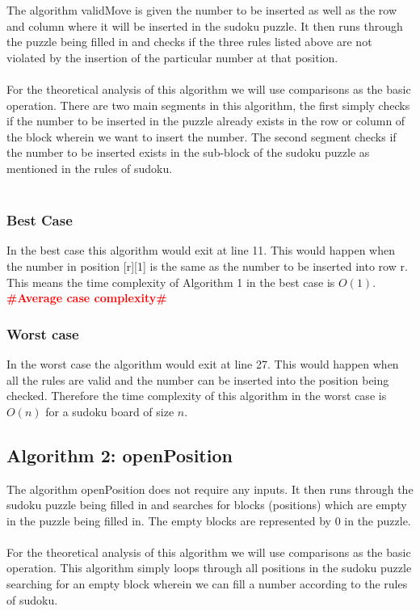 \documentclass[12pt,a4paper,titlepage]{article}
\newcommand{\todo}[1]{\textcolor{red}{\textbf{\##1\#}}}
\begin{document}
The algorithm validMove is given the number to be inserted as well as the row and column where it will be inserted in the sudoku puzzle. It then runs through the puzzle being filled in and checks if the three rules listed above are not violated by the insertion of the particular number at that position.
\\
\\
For the theoretical analysis of this algorithm we will use comparisons as the basic operation. There are two main segments in this algorithm, the first simply checks if  the number to be inserted in the puzzle already exists in the row or column of the block wherein we want to insert the number. The second segment checks if the number to be inserted exists in the sub-block of the sudoku puzzle as mentioned in the rules of sudoku.
\\
\\

\subsubsection{Best Case}

In the best case this algorithm would exit at line 11. This would happen when the number in position [r][1] is the same as the number to be inserted into row r. This means the time complexity of Algorithm 1 in the best case is $O(1)$.
\\
\todo{Average case complexity}
\\

\subsubsection{Worst case}

In the worst case the algorithm would exit at line 27. This would happen when all the rules are valid and the number can be inserted into the position being checked. Therefore the time complexity of this algorithm in the worst case is $O(n)$ for a sudoku board of size $n$.

\subsection{Algorithm 2: openPosition}

The algorithm openPosition does not require any inputs. It then runs through the sudoku puzzle being filled in and searches for blocks (positions) which are empty in the puzzle being filled in. The empty blocks are represented by 0 in the puzzle.
\\
\\
For the theoretical analysis of this algorithm we will use comparisons as the basic operation. This algorithm simply loops through all positions in the sudoku puzzle searching for an empty block wherein we can fill a number according to the rules of sudoku. 
\end{document}
